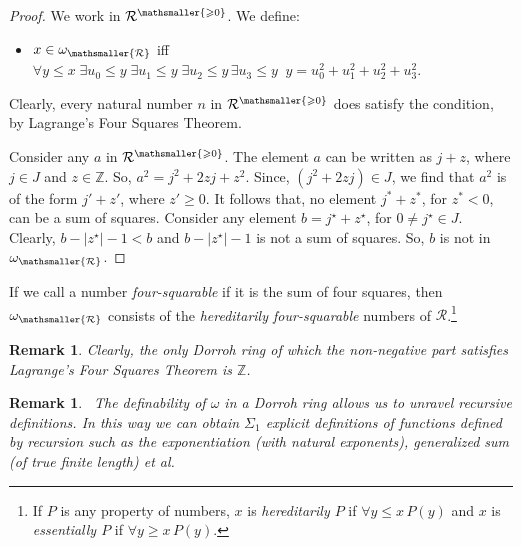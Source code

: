 \documentclass{amsart}
\renewcommand{\leq}{\leqslant}
\renewcommand{\geq}{\geqslant}
\newtheorem{rem}[theorem]{Remark}
\newcommand{\mc}[1]{\mathcal #1}
\newcommand{\bleq}{\mathbin{\leq}}
\begin{document}
\begin{proof}
    We work in $\mc R^{\mathsmaller{\geq 0}}$. We define:
    \begin{itemize}
        \item 
   $x\in \omega_{\mathsmaller{\mc R}} $ iff
    $\forall y \bleq x\; \exists u_0 \bleq y\;\exists u_1\bleq y\;\exists u_2 \bleq y\,\exists u_3 \bleq y\;\; 
    y= u_0^2+u_1^2+u_2^2+u_3^2$.
     \end{itemize}
     Clearly, every natural number $n$ in $\mc R^{\mathsmaller{\geq 0}}$ does satisfy the condition, by
     Lagrange's Four Squares Theorem. 
     
     Consider any $a$ in $\mc R^{\mathsmaller{\geq 0}}$.  The element $a$ can be written as $j+z$, where $j\in J$ and $z\in \mathbb Z$.
     So, $a^2 = j^2+2zj + z^2$. Since,  $(j^2+2zj) \in J$, we find that $a^2$ is of the form $j'+z'$, where $z'\geq 0$.
     It follows that, no element $j^\ast+z^\ast$, for $z^\ast<0$, can be a sum of squares. Consider any element $b =j^\star +z^\star$,
     for $0\neq j^\star\in J$. Clearly, 
     $b-|z^\star|-1<b$ and $b-|z^\star| -1$ is not a sum of squares. So, $b$ is not in  $\omega_{\mathsmaller{\mc R}}$. 
\end{proof}

If we call a number \emph{four-squarable} if it is the sum of four squares, then $ \omega_{\mathsmaller{\mc R}} $ consists of the
\emph{hereditarily four-squarable} numbers of $\mc R$.\footnote{If $P$ is any property of numbers, $x$ is \emph{hereditarily $P$} if
$\forall y\bleq x\, P(y)$ and  $x$ is \emph{essentially $P$} if
$\forall y\mathop{\geq} x\, P(y)$.}

\begin{rem}
    Clearly, the only Dorroh ring of which the non-negative part satisfies Lagrange's Four Squares Theorem is
    $\mathbb Z$. 
\end{rem}

\begin{rem}\label{recursionsmurf}\
    The definability of $\omega$ in a Dorroh ring allows us to unravel recursive definitions. In this way we can obtain $\Sigma_1$ explicit definitions of functions defined by recursion such as the exponentiation \textup(with natural exponents\textup), generalized sum \textup(of true finite length\textup) et al.
\end{rem}
\end{document}
